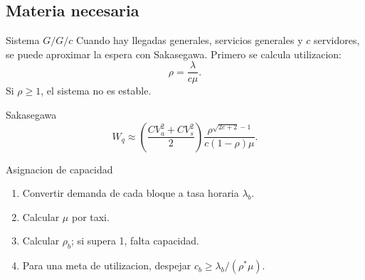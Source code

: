 \subsection{Materia necesaria}

\begin{definicion}{Sistema \(G/G/c\)}
Cuando hay llegadas generales, servicios generales y \(c\) servidores, se puede aproximar la espera con Sakasegawa. Primero se calcula utilizacion:
\[
\rho=\frac{\lambda}{c\mu}.
\]
Si \(\rho\ge 1\), el sistema no es estable.
\end{definicion}

\begin{formulas}{Sakasegawa}
\[
W_q\approx
\left(\frac{CV_a^2+CV_s^2}{2}\right)
\frac{\rho^{\sqrt{2c+2}-1}}{c(1-\rho)\mu}.
\]
\end{formulas}

\begin{algoritmo}{Asignacion de capacidad}
\begin{enumerate}
    \item Convertir demanda de cada bloque a tasa horaria \(\lambda_b\).
    \item Calcular \(\mu\) por taxi.
    \item Calcular \(\rho_b\); si supera 1, falta capacidad.
    \item Para una meta de utilizacion, despejar \(c_b\ge \lambda_b/(\rho^*\mu)\).
\end{enumerate}
\end{algoritmo}
